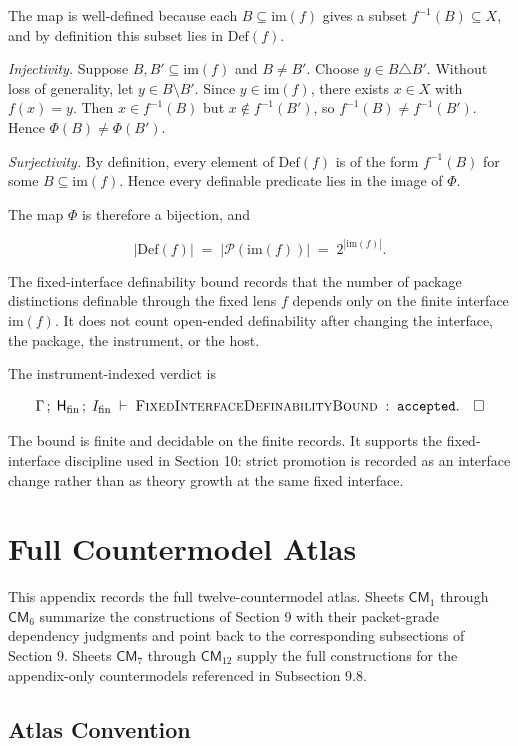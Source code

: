 \documentclass[11pt]{article}
\theoremstyle{definition}
\begin{document}
The map is well-defined because each \(B\subseteq\mathrm{im}(f)\) gives a subset \(f^{-1}(B)\subseteq X\), and by definition this subset lies in \(\mathrm{Def}(f)\).

\emph{Injectivity.} Suppose \(B,B'\subseteq\mathrm{im}(f)\) and \(B\neq B'\). Choose \(y\in B\triangle B'\). Without loss of generality, let \(y\in B\setminus B'\). Since \(y\in\mathrm{im}(f)\), there exists \(x\in X\) with \(f(x)=y\). Then \(x\in f^{-1}(B)\) but \(x\notin f^{-1}(B')\), so \(f^{-1}(B)\neq f^{-1}(B')\). Hence \(\Phi(B)\neq\Phi(B')\).

\emph{Surjectivity.} By definition, every element of \(\mathrm{Def}(f)\) is of the form \(f^{-1}(B)\) for some \(B\subseteq\mathrm{im}(f)\). Hence every definable predicate lies in the image of \(\Phi\).

The map \(\Phi\) is therefore a bijection, and

\[
|\mathrm{Def}(f)|
\;=\;
|\mathcal P(\mathrm{im}(f))|
\;=\;
2^{|\mathrm{im}(f)|}.
\]

The fixed-interface definability bound records that the number of package distinctions definable through the fixed lens \(f\) depends only on the finite interface \(\mathrm{im}(f)\). It does not count open-ended definability after changing the interface, the package, the instrument, or the host.

The instrument-indexed verdict is

\[
\Gamma\,;\;\mathsf H_{\mathrm{fin}}\,;\;I_{\mathrm{fin}}\;\vdash\;\textsc{FixedInterfaceDefinabilityBound}\;:\;\texttt{accepted}.\quad\square
\]

The bound is finite and decidable on the finite records. It supports the fixed-interface discipline used in Section 10: strict promotion is recorded as an interface change rather than as theory growth at the same fixed interface.
 \section{Full Countermodel Atlas}

This appendix records the full twelve-countermodel atlas. Sheets \(\mathsf{CM}_1\) through \(\mathsf{CM}_6\) summarize the constructions of Section 9 with their packet-grade dependency judgments and point back to the corresponding subsections of Section 9. Sheets \(\mathsf{CM}_7\) through \(\mathsf{CM}_{12}\) supply the full constructions for the appendix-only countermodels referenced in Subsection 9.8.

\subsection{Atlas Convention}
\end{document}
